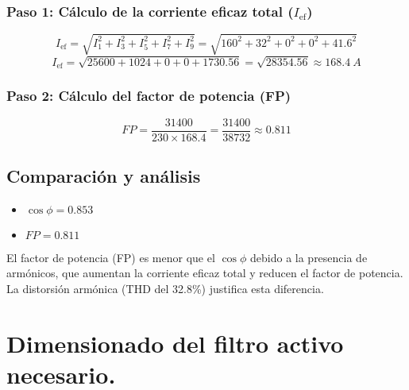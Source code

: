 \documentclass[a4paper,10pt]{article}
\begin{document}
\begin{Form}
\subsubsection{Paso 1: Cálculo de la corriente eficaz total (\(I_{\text{ef}}\))}
\[
I_{\text{ef}} = \sqrt{I_1^2 + I_3^2 + I_5^2 + I_7^2 + I_9^2} = \sqrt{160^2 + 32^2 + 0^2 + 0^2 + 41.6^2}
\]
\[
I_{\text{ef}} = \sqrt{25600 + 1024 + 0 + 0 + 1730.56} = \sqrt{28354.56} \approx \SI{168.4}{A}
\]


\subsubsection{Paso 2: Cálculo del factor de potencia (FP)}
\[
FP = \frac{31400}{230 \times 168.4} = \frac{31400}{38732} \approx 0.811
\]

\subsection{Comparación y análisis}
\begin{itemize}
    \item \(\cos \phi = 0.853\)
    \item \(FP = 0.811\)
\end{itemize}

El factor de potencia (FP) es menor que el \(\cos \phi\) debido a la presencia de armónicos, que aumentan la corriente eficaz total y reducen el factor de potencia. La distorsión armónica (THD del 32.8\%) justifica esta diferencia.






























\section{Dimensionado del ﬁltro activo necesario. }


\end{Form}
\end{document}
